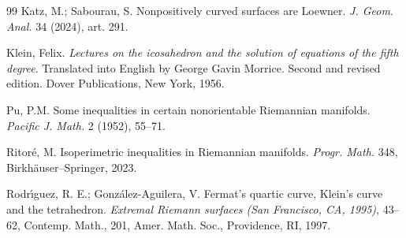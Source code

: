 \documentclass[12pt,reqno]{amsart}
\theoremstyle{definition}
\numberwithin{equation}{section}
\numberwithin{equation}{section}
\begin{document}
\begin{thebibliography}{99}
Katz, M.; Sabourau, S. Nonpositively curved surfaces are Loewner.
\emph{J. Geom. Anal.} 34 (2024), art. 291.


 Klein, Felix.  \emph{Lectures on the icosahedron and
the solution of equations of the fifth degree}.  Translated into
  English by George Gavin Morrice. Second and revised edition.  Dover
  Publications, New York, 1956.

Pu, P.M. Some inequalities in certain nonorientable Riemannian manifolds.
\emph{Pacific J. Math.} 2 (1952), 55--71.

Ritor\'e, M. Isoperimetric inequalities in Riemannian manifolds.
\emph{Progr. Math.} 348, Birkh\"auser--Springer, 2023.

 Rodr\'{\i}guez, R. E.; Gonz\'alez-Aguilera, V.
  Fermat's quartic curve, Klein's curve and the tetrahedron.
  \emph{Extremal Riemann surfaces (San Francisco, CA, 1995)}, 43–62,
  Contemp. Math., 201, Amer. Math. Soc., Providence, RI, 1997.


\end{thebibliography}
\end{document}
